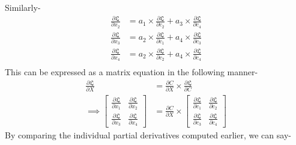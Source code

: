 Similarly-
\begin{align*}
\frac{\partial \mathfrak{L}}{\partial x_2}
&= a_1 \times \frac{\partial \mathfrak{L}}{\partial c_2} + a_3 \times \frac{\partial \mathfrak{L}}{\partial c_4}\\
\frac{\partial \mathfrak{L}}{\partial x_3}
&= a_2 \times \frac{\partial \mathfrak{L}}{\partial c_1} + a_4 \times \frac{\partial \mathfrak{L}}{\partial c_3}\\
\frac{\partial \mathfrak{L}}{\partial x_4}
&= a_2 \times \frac{\partial \mathfrak{L}}{\partial c_2} + a_4 \times \frac{\partial \mathfrak{L}}{\partial c_4}\\
\end{align*}
This can be expressed as a matrix equation in the following manner-
\begin{align*}
\frac{\partial \mathfrak{L}}{\partial X} &= \frac{\partial C}{\partial X} \times \frac{\partial \mathfrak{L}}{\partial C}\\
\implies \begin{bmatrix}
\frac{\partial \mathfrak{L}}{\partial x_1} & \frac{\partial \mathfrak{L}}{\partial x_2} \\
\frac{\partial \mathfrak{L}}{\partial x_3} & \frac{\partial \mathfrak{L}}{\partial x_4}
\end{bmatrix} &= \frac{\partial C}{\partial X} \times \begin{bmatrix}
\frac{\partial \mathfrak{L}}{\partial c_1} & \frac{\partial \mathfrak{L}}{\partial c_2} \\
\frac{\partial \mathfrak{L}}{\partial c_3} & \frac{\partial \mathfrak{L}}{\partial c_4}
\end{bmatrix}
\end{align*}
By comparing the individual partial derivatives computed earlier, we can say-

